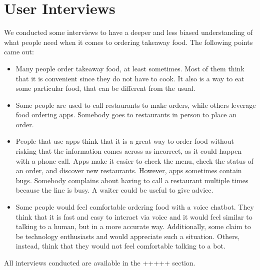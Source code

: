 \section{User Interviews}

We conducted some interviews to have a deeper and less biased understanding of
what people need when it comes to ordering takeaway food. The following
points came out:

\begin{itemize}
    \item Many people order takeaway food, at least sometimes. Most of them think
    that it is convenient since they do not have to cook. It also is a way to
    eat some particular food, that can be different from the usual.
    \item Some people are used to call restaurants to make orders, while others
    leverage food ordering apps. Somebody goes to restaurants in person to place
    an order.
    \item People that use apps think that it is a great way to order food without
    risking that the information comes across as incorrect, as it could happen
    with a phone call. Apps make it easier to check the menu, check the status
    of an order, and discover new restaurants. However, apps sometimes contain
    bugs. Somebody complains about having to call a restaurant multiple
    times because the line is busy. A waiter could be useful to give advice.
    \item Some people would feel comfortable ordering food with a voice chatbot.
    They think that it is fast and easy to interact via voice and it would feel
    similar to talking to a human, but in a more accurate way. Additionally, some
    claim to be technology enthusiasts and would appreciate such a situation.
    Others, instead,
    think that they would not feel comfortable talking to a bot.

\end{itemize}

All interviews conducted are available in the +++++ section.
